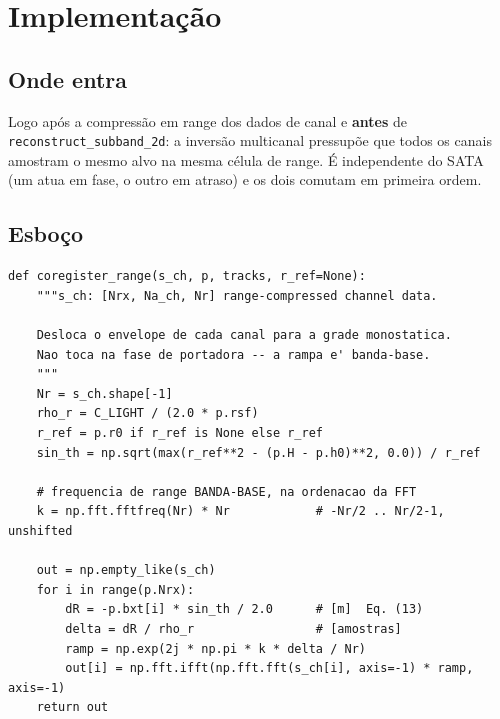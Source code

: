 \documentclass[11pt,a4paper]{article}
\begin{document}
\section{Implementação}

\subsection{Onde entra}

Logo após a compressão em range dos dados de canal e \textbf{antes} de
\texttt{reconstruct\_subband\_2d}: a inversão multicanal pressupõe que todos
os canais amostram o mesmo alvo na mesma célula de range. É independente do
SATA (um atua em fase, o outro em atraso) e os dois comutam em primeira
ordem.

\begin{center}
\end{center}

\subsection{Esboço}

\begin{lstlisting}
def coregister_range(s_ch, p, tracks, r_ref=None):
    """s_ch: [Nrx, Na_ch, Nr] range-compressed channel data.

    Desloca o envelope de cada canal para a grade monostatica.
    Nao toca na fase de portadora -- a rampa e' banda-base.
    """
    Nr = s_ch.shape[-1]
    rho_r = C_LIGHT / (2.0 * p.rsf)
    r_ref = p.r0 if r_ref is None else r_ref
    sin_th = np.sqrt(max(r_ref**2 - (p.H - p.h0)**2, 0.0)) / r_ref

    # frequencia de range BANDA-BASE, na ordenacao da FFT
    k = np.fft.fftfreq(Nr) * Nr            # -Nr/2 .. Nr/2-1, unshifted

    out = np.empty_like(s_ch)
    for i in range(p.Nrx):
        dR = -p.bxt[i] * sin_th / 2.0      # [m]  Eq. (13)
        delta = dR / rho_r                 # [amostras]
        ramp = np.exp(2j * np.pi * k * delta / Nr)
        out[i] = np.fft.ifft(np.fft.fft(s_ch[i], axis=-1) * ramp, axis=-1)
    return out
\end{lstlisting}
\end{document}
